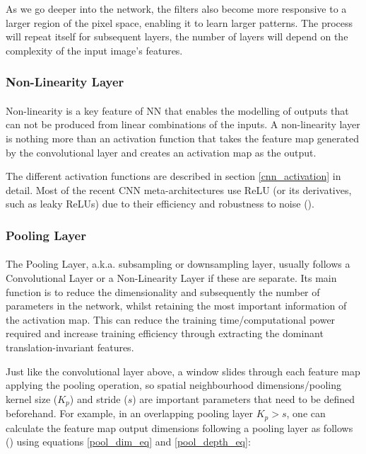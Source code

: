 As we go deeper into the network, the filters also become more responsive to a larger region of the pixel space, enabling it to learn larger patterns. The process will repeat itself for subsequent layers, the number of layers will depend on the complexity of the input image's features.

\subsubsection{Non-Linearity Layer}
\paragraph{}
Non-linearity is a key feature of \gls{NN} that enables the modelling of outputs that can not be produced from linear combinations of the inputs. A non-linearity layer is nothing more than an activation function that takes the feature map generated by the convolutional layer and creates an activation map as the output. 

The different activation functions are described in section \ref{cnn_activation} in detail. Most of the recent \gls{CNN} meta-architectures use \gls{ReLU} (or its derivatives, such as leaky \gls{ReLU}s) due to their efficiency and robustness to noise (\cite{He_2015_ICCV}).

\subsubsection{Pooling Layer}
\paragraph{}
The Pooling Layer, \gls{a.k.a.} subsampling or downsampling layer, usually follows a Convolutional Layer or a Non-Linearity Layer if these are separate. 
Its main function is to reduce the dimensionality and subsequently the number of parameters in the network, whilst retaining the most important information of the activation map. This can reduce the training time/computational power required and increase training efficiency through extracting the dominant translation-invariant features.

Just like the convolutional layer above, a window slides through each feature map applying the pooling operation, so spatial neighbourhood dimensions/pooling kernel size ($K_p$) and stride ($s$) are important parameters that need to be defined beforehand. For example, in an overlapping pooling layer $K_p > s$, one can calculate the feature map output dimensions following a pooling layer as follows (\cite{dumoulin2018guide}) using equations \ref{pool_dim_eq} and \ref{pool_depth_eq}:

